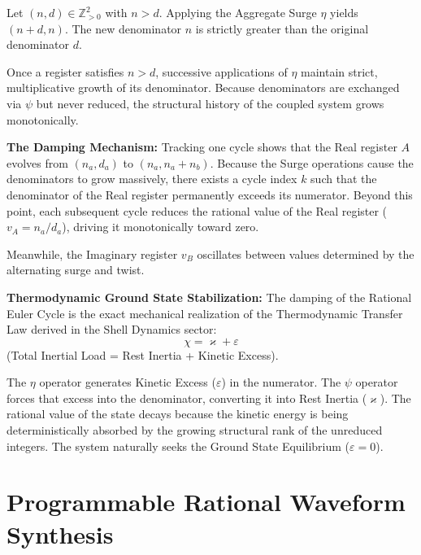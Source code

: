 \documentclass[11pt, letterpaper]{article}
\newcommand{\Z}{\mathbb{Z}}
\newcommand{\aop}{\eta}
\newcommand{\psiop}{\psi}
\begin{document}
\begin{theorem}\label{thm:damping}
\begin{rsbox}
Let $(n,d) \in \Z_{>0}^2$ with $n > d$. Applying the Aggregate Surge $\aop$ yields $(n+d, n)$. The new denominator $n$ is strictly greater than the original denominator $d$.

Once a register satisfies $n > d$, successive applications of $\aop$ maintain strict, multiplicative growth of its denominator. Because denominators are exchanged via $\psiop$ but never reduced, the structural history of the coupled system grows monotonically.

\textbf{The Damping Mechanism:}
Tracking one cycle shows that the Real register $A$ evolves from $(n_a, d_a)$ to $(n_a, n_a + n_b)$.
Because the Surge operations cause the denominators to grow massively, there exists a cycle index $k$ such that the denominator of the Real register permanently exceeds its numerator.
Beyond this point, each subsequent cycle reduces the rational value of the Real register ($v_A = n_a / d_a$), driving it monotonically toward zero.

Meanwhile, the Imaginary register $v_B$ oscillates between values determined by the alternating surge and twist.
\end{rsbox}
\end{theorem}

\begin{observebox}
\textbf{Thermodynamic Ground State Stabilization:}
The damping of the Rational Euler Cycle is the exact mechanical realization of the Thermodynamic Transfer Law derived in the Shell Dynamics sector:
\[ \chi = \varkappa + \varepsilon \]
(Total Inertial Load = Rest Inertia + Kinetic Excess).

The $\aop$ operator generates Kinetic Excess ($\varepsilon$) in the numerator. The $\psiop$ operator forces that excess into the denominator, converting it into Rest Inertia ($\varkappa$). The rational value of the state decays because the kinetic energy is being deterministically absorbed by the growing structural rank of the unreduced integers. The system naturally seeks the Ground State Equilibrium ($\varepsilon = 0$).
\end{observebox}

\section{Programmable Rational Waveform Synthesis}
\end{document}
